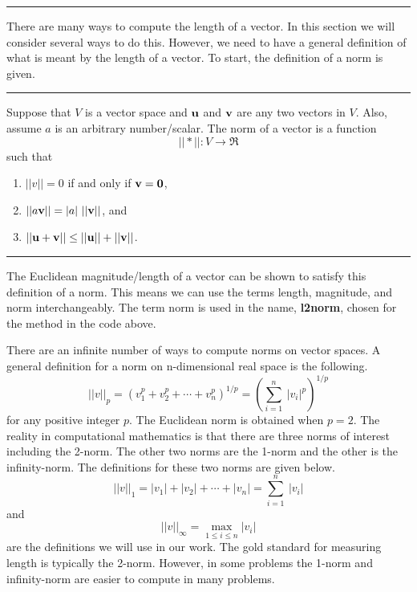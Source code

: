 \documentclass[10pt,fleqn]{article}
\begin{document}
\vskip0.1in\hrule\vskip0.1in
\noindent
There are many ways to compute the length of a vector. In this section we will
consider several ways to do this. However, we need to have a general definition
of what is meant by the length of a vector. To start, the definition of a norm
is given.
\vskip0.1in\hrule\vskip0.1in
\begin{definition}
   Suppose that $V$ is a vector space and ${\bf u}$ and ${\bf v}$ are any two
   vectors in $V$. Also, assume $a$ is an arbitrary number/scalar. The norm of a
   vector is a function
   $$
     || * || : V \rightarrow \Re
   $$
   such that
   \begin{enumerate}
     \item $||v||=0$ if and only if ${\bf v} = {\bf 0}$,
     \item $||a{\bf v}|| = |a|\ ||{\bf v}||$, and
     \item $||{\bf u} + {\bf v} || \leq ||{\bf u}|| + ||{\bf v}||$.
   \end{enumerate}
\end{definition}
\vskip0.1in\hrule\vskip0.1in
The Euclidean magnitude/length of a vector can be shown to satisfy this
definition of a norm. This means we can use the terms length, magnitude, and
norm interchangeably. The term norm is used in the name, {\bf l2norm}, chosen
for the method in the code above.

There are an infinite number of ways to compute norms on vector spaces. A
general definition for a norm on n-dimensional real space is the following.
$$
  ||v||_p = \left( v_1^p + v_2^p + \cdots + v_n^p \right)^{1/p}
              = \left( \sum_{i=1}^n\ |v_i|^p \right)^{1/p}
$$
for any positive integer $p$. The Euclidean norm is obtained when $p=2$. The
reality in computational mathematics is that there are three norms of interest
including the 2-norm. The other two norms are the 1-norm and the other is the
infinity-norm.  The definitions for these two norms are given below.
$$
  ||v||_1 = | v_1 | + | v_2 | + \cdots + | v_n | = \sum_{i=1}^n\ |v_i|
$$
and
$$
  ||v||_\infty = \max_{1\leq i\leq n} | v_i | 
$$
are the definitions we will use in our work. The gold standard for measuring
length is typically the 2-norm. However, in some problems the 1-norm and
infinity-norm are easier to compute in many problems.
\end{document}
